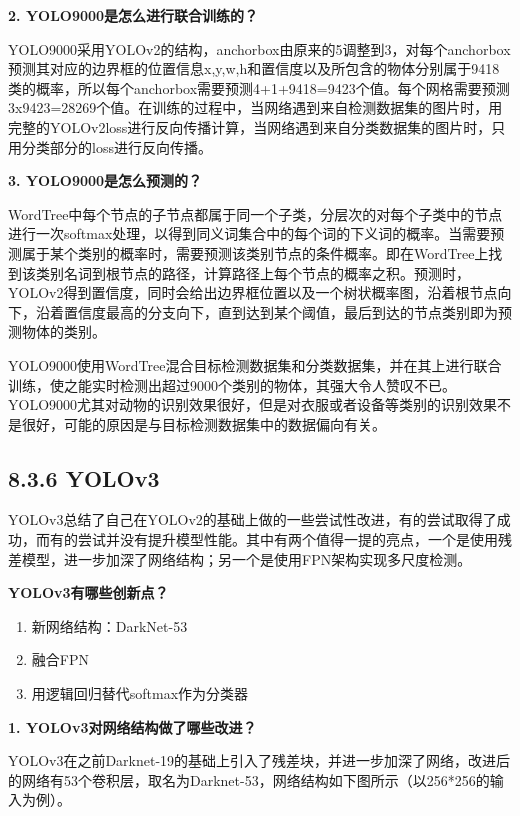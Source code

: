 \textbf{2. YOLO9000是怎么进行联合训练的？}

YOLO9000采用YOLOv2的结构，anchorbox由原来的5调整到3，对每个anchorbox预测其对应的边界框的位置信息x,y,w,h和置信度以及所包含的物体分别属于9418类的概率，所以每个anchorbox需要预测4+1+9418=9423个值。每个网格需要预测3x9423=28269个值。在训练的过程中，当网络遇到来自检测数据集的图片时，用完整的YOLOv2loss进行反向传播计算，当网络遇到来自分类数据集的图片时，只用分类部分的loss进行反向传播。

\textbf{3. YOLO9000是怎么预测的？}

WordTree中每个节点的子节点都属于同一个子类，分层次的对每个子类中的节点进行一次softmax处理，以得到同义词集合中的每个词的下义词的概率。当需要预测属于某个类别的概率时，需要预测该类别节点的条件概率。即在WordTree上找到该类别名词到根节点的路径，计算路径上每个节点的概率之积。预测时，YOLOv2得到置信度，同时会给出边界框位置以及一个树状概率图，沿着根节点向下，沿着置信度最高的分支向下，直到达到某个阈值，最后到达的节点类别即为预测物体的类别。

YOLO9000使用WordTree混合目标检测数据集和分类数据集，并在其上进行联合训练，使之能实时检测出超过9000个类别的物体，其强大令人赞叹不已。YOLO9000尤其对动物的识别效果很好，但是对衣服或者设备等类别的识别效果不是很好，可能的原因是与目标检测数据集中的数据偏向有关。

\subsection{8.3.6 YOLOv3}\label{yolov3}

YOLOv3总结了自己在YOLOv2的基础上做的一些尝试性改进，有的尝试取得了成功，而有的尝试并没有提升模型性能。其中有两个值得一提的亮点，一个是使用残差模型，进一步加深了网络结构；另一个是使用FPN架构实现多尺度检测。

\textbf{YOLOv3有哪些创新点？}

\begin{enumerate}
\def\labelenumi{\arabic{enumi}.}
\item
  新网络结构：DarkNet-53
\item
  融合FPN
\item
  用逻辑回归替代softmax作为分类器
\end{enumerate}

\textbf{1. YOLOv3对网络结构做了哪些改进？}

YOLOv3在之前Darknet-19的基础上引入了残差块，并进一步加深了网络，改进后的网络有53个卷积层，取名为Darknet-53，网络结构如下图所示（以256*256的输入为例）。

\begin{figure}
\centering
\caption{}
\end{figure}

